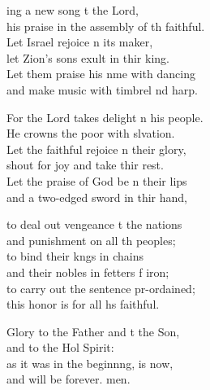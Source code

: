 \settowidth{\versewidth}{his praise in the assembly of the faithful.}
\begin{psalmverse}%
  \begin{patverse}
    ing a new song t the Lord,\Med\\
his praise in the assembly of th faithful.\\
Let Israel rejoice \pointup{\i}n its maker,\Med\\
let Zion’s sons exult in thir king.\\
Let them praise his nme with dancing\Med\\
and make music with timbrel nd harp.

For the Lord takes delight \pointup{\i}n his people.\Med\\
He crowns the poor with slvation.\\
Let the faithful rejoice \pointup{\i}n their glory,\Med\\
shout for joy and take thir rest.\\
Let the praise of God be n their lips\Med\\
and a two-edged sword in thir hand,

to deal out vengeance t the nations\Med\\
and punishment on all th peoples;\\
to bind their k\pointup{\i}ngs in chains\Med\\
and their nobles in fetters f iron;\\
to carry out the sentence pr-ordained;\Med\\
this honor is for all h\pointup{\i}s faithful.

Glory to the Father and t the Son,\Med\\
and to the Hol Spirit:\\
as it was in the beginn\pointup{\i}ng, is now,\Med\\
and will be forever. men.
  \end{patverse}
\end{psalmverse}
